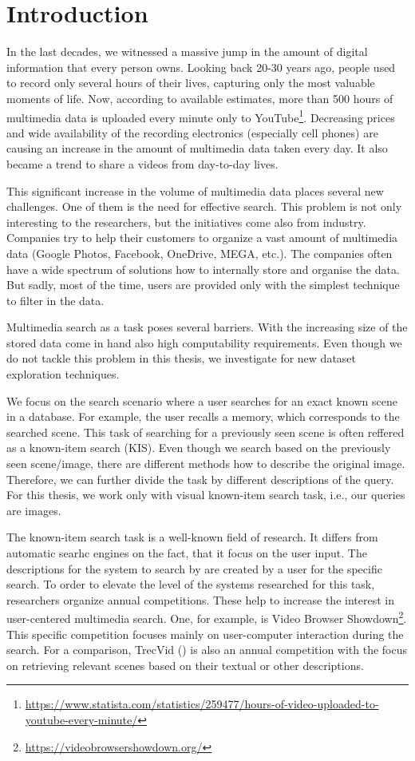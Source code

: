 \chapter*{Introduction}

In the last decades, we witnessed a massive jump in the amount of digital information that every person owns. Looking back 20-30 years ago, people used to record only several hours of their lives, capturing only the most valuable moments of life. Now, according to available estimates, more than 500 hours of multimedia data is uploaded every minute only to YouTube\footnote{\url{https://www.statista.com/statistics/259477/hours-of-video-uploaded-to-youtube-every-minute/}}. Decreasing prices and wide availability of the recording electronics (especially cell phones) are causing an increase in the amount of multimedia data taken every day. It also became a trend to share a videos from day-to-day lives.

This significant increase in the volume of multimedia data places several new challenges. One of them is the need for effective search. This problem is not only interesting to the researchers, but the initiatives come also from industry. Companies try to help their customers to organize a vast amount of multimedia data (Google Photos, Facebook, OneDrive, MEGA, etc.). The companies often have a wide spectrum of solutions how to internally store and organise the data. But sadly, most of the time, users are provided only with the simplest technique to filter in the data.

Multimedia search as a task poses several barriers. With the increasing size of the stored data come in hand also high computability requirements. Even though we do not tackle this problem in this thesis, we investigate for new dataset exploration techniques.

We focus on the search scenario where a user searches for an exact known scene in a database. For example, the user recalls a memory, which corresponds to the searched scene. This task of searching for a previously seen scene is often reffered as a known-item search (KIS). Even though we search based on the previously seen scene/image, there are different methods how to describe the original image. Therefore, we can further divide the task by different descriptions of the query. For this thesis, we work only with visual known-item search task, i.e., our queries are images.

The known-item search task is a well-known field of research. It differs from automatic searhc engines on the fact, that it focus on the user input. The descriptions for the system to search by are created by a user for the specific search. To order to elevate the level of the systems researched for this task, researchers organize annual competitions. These help to increase the interest in user-centered multimedia search. One, for example, is Video Browser Showdown\footnote{\url{https://videobrowsershowdown.org/}}. This specific competition focuses mainly on user-computer interaction during the search. For a comparison, TrecVid (\cite{2019trecvidawad}) is also an annual competition with the focus on retrieving relevant scenes based on their textual or other descriptions.

